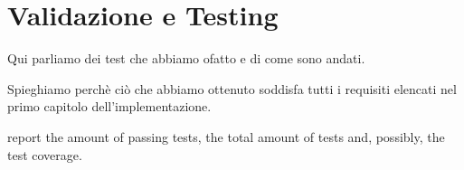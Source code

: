\section{Validazione e Testing}
\label{Testing}

Qui parliamo dei test che abbiamo ofatto e di come sono andati. 

Spieghiamo perchè ciò che abbiamo ottenuto soddisfa tutti i requisiti elencati nel primo capitolo dell'implementazione.

 report the amount of passing tests, the total amount of tests and, possibly, the test coverage.
